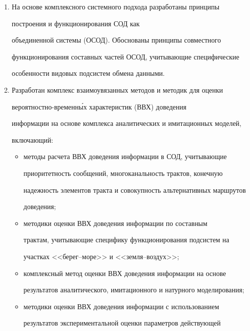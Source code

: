 \begin{enumerate}[1.]


\item  На основе комплексного сис\-тем\-но\-го подхода разработаны принципы 


построения и функционирования СОД как 


объединенной сис\-те\-мы (ОСОД). Обоснованы принципы совместного 


функционирования составных частей ОСОД, учитывающие специфические 


особенности видовых под\-сис\-тем обмена данными.\\[-15pt]


\item  Разработан комплекс взаимоувязанных методов и методик для оценки 


ве\-ро\-ят\-но\-ст\-но-вре\-мен\-н\'{ы}х характеристик (ВВХ) доведения 


информации на основе комплекса аналитических и имитационных моделей, 


включающий:\\[-15pt]


\begin{itemize}


\item методы расчета ВВХ доведения информации в СОД, учитывающие 


приоритетность сообщений, многоканальность трактов, конечную 


надежность элементов тракта и совокупность альтернативных маршрутов 


доведения;\\[-15pt]


\item методики оценки ВВХ доведения информации по составным 


трактам, учитывающие специфику функционирования под\-сис\-тем на 


участках <<бе\-рег--мо\-ре>> и <<зем\-ля--воздух>>;\\[-15pt]


\item комплексный метод оценки ВВХ доведения информации на основе 


результатов аналитического, имитационного и натурного моделирования;\\[-15pt]


\item методики оценки ВВХ доведения информации с использованием 


результатов экспериментальной оценки параметров действующей 



\end{itemize}
\end{enumerate}
